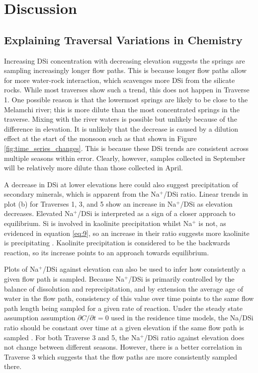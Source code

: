 

\section{Discussion}

\subsection{Explaining Traversal Variations in Chemistry}
\label{subsection:trav}

Increasing DSi concentration with decreasing elevation suggests the springs are sampling increasingly longer flow paths. This is because longer flow paths allow for more water-rock interaction, which scavenges more DSi from the silicate rocks. While most traverses show such a trend, this does not happen in Traverse 1. One possible reason is that the lowermost springs are likely to be close to the Melamchi river; this is more dilute than the most concentrated springs in the traverse. Mixing with the river waters is possible but unlikely because of the difference in elevation. It is unlikely that the decrease is caused by a dilution effect at the start of the monsoon such as that shown in Figure \ref{fig:time_series_changes}. This is because these DSi trends are consistent across multiple seasons within error. Clearly, however, samples collected in September will be relatively more dilute than those collected in April.

\bsk

A decrease in DSi at lower elevations here could also suggest precipitation of secondary minerals, which is apparent from the Na$^+$/DSi ratio. Linear trends in plot (b) for Traverses 1, 3, and 5 show an increase in Na$^+$/DSi as elevation decreases. Elevated Na$^+$/DSi is interpreted as a sign of a closer approach to equilibrium. Si is involved in kaolinite precipitation whilst Na$^+$ is not, as evidenced in equation \ref{eq:9}, so an increase in their ratio suggests more kaolinite is precipitating \parencite{gaillardetGlobalSilicateWeathering1999}. Kaolinite precipitation is considered to be the backwards reaction, so its increase points to an approach towards equilibrium.

\bsk

Plots of Na$^+$/DSi against elevation can also be used to infer how consistently a given flow path is sampled. Because Na$^+$/DSi is primarily controlled by the balance of dissolution and reprecipitation, and by extension the average age of water in the flow path, consistency of this value over time points to the same flow path length being sampled for a given rate of reaction. Under the steady state assumption assumption $\partial C/\partial t = 0$ used in the residence time models, the Na/DSi ratio should be constant over time at a given elevation if the same flow path is sampled \parencite{lichtner}. For both Traverse 3 and 5, the Na$^+$/DSi ratio against elevation does not change between different seasons. However, there is a better correlation in Traverse 3 which suggests that the flow paths are more consistently sampled there.



